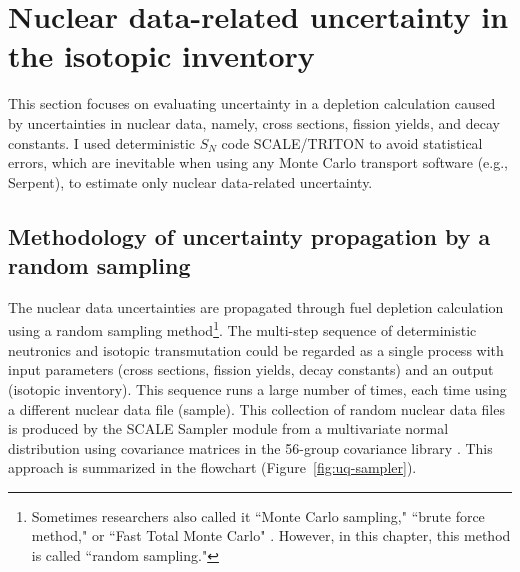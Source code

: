 \section{Nuclear data-related uncertainty in the isotopic inventory}
This section focuses on evaluating uncertainty in a depletion calculation 
caused by uncertainties in nuclear data, namely, cross sections, fission 
yields, and decay constants. I used deterministic $S_N$ code SCALE/TRITON 
\cite{rearden_scale_2018} to avoid statistical errors, which are inevitable 
when using any Monte Carlo transport software (e.g., Serpent), to estimate 
only nuclear data-related uncertainty.

\subsection{Methodology of uncertainty propagation by a random sampling}
The nuclear data uncertainties are propagated through fuel depletion 
calculation using a random sampling method\footnote{Sometimes researchers also 
called it ``Monte Carlo sampling," \cite{radaideh_using_2019-1} ``brute 
force method,"\cite{garcia-herranz_propagation_2008} or ``Fast Total Monte 
Carlo" \cite{rochman_nuclear_2014}. However, in this chapter, this method is 
called ``random  sampling."}. The multi-step sequence of deterministic 
neutronics and isotopic transmutation could be regarded as a single 
process with input parameters (cross sections, fission yields, decay 
constants) and an output (isotopic inventory). This sequence runs a 
large number of times, each time using a different nuclear data file (sample). 
This collection of random nuclear data files is produced by the SCALE Sampler 
module from a multivariate normal distribution using covariance matrices in 
the 56-group covariance library \cite{rearden_scale_2018, 
radaideh_novel_2019-1}. This approach is summarized in the flowchart 
(Figure~\ref{fig:uq-sampler}).

